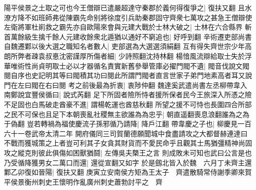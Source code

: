 陽平侯景之土取之可也今王僧辯已遣嚴超達守秦郡於義何得復爭之|{
	復扶又翻}
且水潦方降不如班師弗從陳霸先命别將徐度引兵助秦郡固守齊衆七萬攻之甚急王僧辯使左衛將軍杜崱救之霸先亦自歐陽來會與元建大戰於士林大破之|{
	士林在六合縣界}
斬首萬餘級生擒千餘人元建收餘衆北遁猶以通好不窮追也|{
	好呼到翻}
辛術遷吏部尚書自魏遷鄴以後大選之職知名者數人|{
	吏部選為大選選須絹翻}
互有得失齊世宗少年高朗所弊者疎袁叔悳沈密謹厚所傷者細|{
	少詩照翻沈持林翻}
楊愔風流辯給取士失於浮華唯術性尚貞明取士必以才器循名責實新舊參舉管庫必擢門閥不遺|{
	閥音伐說文閥閱自序也史記明其等曰閥積其功曰閱此所謂門閥者直言世家子弟門地素高者耳又說門在左曰閥在右曰閱}
考之前後最為折衷|{
	衷陟仲翻}
魏達奚武遣尚書左丞柳帶韋入南鄭說宜豐侯循曰|{
	說式芮翻}
足下所固者險所恃者援所保者民今王旅深入所憑之險不足固也白馬破走酋豪不進|{
	謂楊乾運也酋慈秋翻}
所望之援不可恃也長圍四合所部之民不可保也且足下本朝喪亂社稷無主欲誰為為忠乎|{
	朝直遥翻喪息浪翻誰為之為于偽翻}
豈若轉禍為福使慶流子孫邪循乃請降|{
	降戶江翻}
帶韋慶之子也|{
	柳慶見一百六十一卷武帝太清二年}
開府儀同三司賀蘭德願聞城中食盡請攻之大都督赫連達曰不戰而獲城策之上者豈可利其子女貪其財貨而不愛民命乎且觀其士馬猶彊精神尚固攻之縱克則彼此俱傷如困獸猶鬪|{
	左傳吳夫槩王之言}
則成敗未可知也武曰公言是也乃受循降獲男女二萬口而還|{
	還從宣翻又如字}
於是劔北皆入於魏　六月丁未齊主還鄴乙卯復如晉陽|{
	復扶又翻}
庚寅立安南侯方矩為王太子　齊遣散騎常侍謝季卿來賀平侯景衡州刺史王懷明作亂廣州刺史蕭勃討平之　齊

